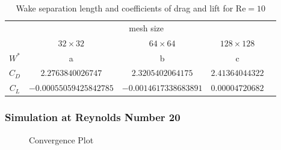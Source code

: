 	\begin{table}[htp]
		\centering
		\begin{tabular}{|c||c|c|c|c}
			\cline{1-4}
			\rule{0pt}{2,3ex}\multirow{2}{*}{}   & \multicolumn{3}{c|}{mesh size} &  \\ \cline{2-4}
			\rule{0pt}{2,3ex}& $32 \times 32$       & $64 \times 64$       & $128 \times 128$      &  \\ \cline{1-4}
			\rule{0pt}{2,3ex}$W^*$ 				 & a        & b        & c        &  \\ \cline{1-4}
			\rule{0pt}{2,3ex}$C_D$                & $2.2763840026747$        & $2.3205402064175$        & $2.41364044322$        &  \\ \cline{1-4}
			\rule{0pt}{2,3ex}$C_L$                & $-0.00055059425842785$        & $-0.0014617338683891$        & $0.00004720682$        &  \\ \cline{1-4}
		\end{tabular}
		\caption{Wake separation length and coefficients of drag and lift for $\text{Re}=10$}
		\label{tab:re10}
	\end{table}
	
	\subsubsection{Simulation at Reynolds Number 20}
	\begin{figure}[htp]	
		\centering
		\label{shivfjftersaror}	
		\caption{Convergence Plot}
	\end{figure}
	
